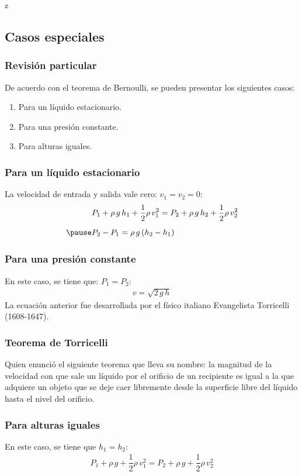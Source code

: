 z\documentclass[14pt]{beamer}
\begin{document}
\subsection{Casos especiales}

\begin{frame}
\frametitle{Revisión particular}
De acuerdo con el teorema de Bernoulli, se pueden presentar los siguientes casos:
\begin{enumerate}[<+->]
\item Para un líquido estacionario.
\item Para una presión constante.
\item Para alturas iguales.
\end{enumerate}
\end{frame}
\begin{frame}
\frametitle{Para un líquido estacionario}
La velocidad de entrada y salida vale cero: $v_{1} = v_{2} = 0$:
\pause
\begin{eqnarray*}
\begin{aligned}
&P_{1} + \rho \, g \, h_{1} + \dfrac{1}{2} \rho \, v_{1}^{2} = P_{2} + \rho \, g \, h_{2} + \dfrac{1}{2} \rho \, v_{2}^{2} \\[0.5em] \pause
&P_{2} - P_{1} = \rho \, g \left( h_{2} - h_{1} \right)
\end{aligned}
\end{eqnarray*}
\end{frame}
\begin{frame}
\frametitle{Para una presión constante}
En este caso, se tiene que: $P_{1} = P_{2}$:
\pause
\begin{align*}
v = \sqrt{2 \, g \, h}
\end{align*}
La ecuación anterior fue desarrollada por el físico italiano Evangelista Torricelli (1608-1647).
\end{frame}
\begin{frame}
\frametitle{Teorema de Torricelli}
Quien enunció el siguiente teorema que lleva su nombre: \pause la magnitud de la velocidad con que sale un líquido por el orificio de un recipiente es igual a la que adquiere un objeto que se deje caer libremente desde la superficie libre del líquido hasta el nivel del orificio.
\end{frame}
\begin{frame}
\frametitle{Para alturas iguales}
En este caso, se tiene que $h_{1} = h_{2}$:
\pause
\begin{align*}
P_{1} + \rho \, g + \dfrac{1}{2} \rho \, v_{1}^{2} = P_{2} + \rho \, g + \dfrac{1}{2} \rho \, v_{2}^{2}
\end{align*}
\end{frame}
\end{document}

